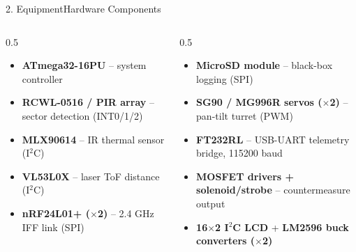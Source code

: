 \documentclass[aspectratio=169, 10pt]{beamer}
\begin{document}
\begin{frame}{2. Equipment}{Hardware Components}
    \footnotesize
    \begin{columns}[T]
        \begin{column}{0.5\textwidth}
            \begin{itemize}
                \item \textbf{ATmega32-16PU} -- system controller
                \item \textbf{RCWL-0516 / PIR array} -- sector detection (INT0/1/2)
                \item \textbf{MLX90614} -- IR thermal sensor (I$^2$C)
                \item \textbf{VL53L0X} -- laser ToF distance (I$^2$C)
                \item \textbf{nRF24L01+ ($\times$2)} -- 2.4 GHz IFF link (SPI)
            \end{itemize}
        \end{column}
        \begin{column}{0.5\textwidth}
            \begin{itemize}
                \item \textbf{MicroSD module} -- black-box logging (SPI)
                \item \textbf{SG90 / MG996R servos ($\times$2)} -- pan-tilt turret (PWM)
                \item \textbf{FT232RL} -- USB-UART telemetry bridge, 115200 baud
                \item \textbf{MOSFET drivers + solenoid/strobe} -- countermeasure output
                \item \textbf{16$\times$2 I$^2$C LCD} + \textbf{LM2596 buck converters ($\times$2)}
            \end{itemize}
        \end{column}
    \end{columns}
\end{frame}
\end{document}
